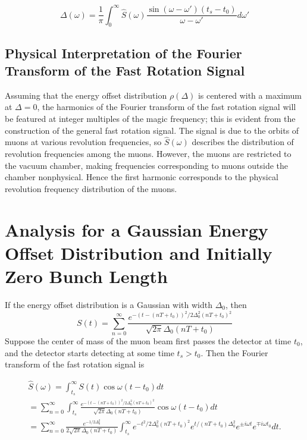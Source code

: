 \begin{equation}
\Delta(\omega)=\frac{1}{\pi}\int^{\infty}_0\hat{S}(\omega)\frac{\sin(\omega-\omega')(t_s-t_0)}{\omega-\omega'}d\omega'
\label{eq:approxDelta}
\end{equation}

\subsection{Physical Interpretation of the Fourier Transform of the Fast Rotation Signal}

Assuming that the energy offset distribution $\rho(\Delta)$ is centered with a maximum at $\Delta=0$, the harmonics of the Fourier transform of the fast rotation signal will be featured at integer multiples of the magic frequency; this is evident from the construction of the general fast rotation signal. The signal is due to the orbits of muons at various revolution frequencies, so $\hat{S}(\omega)$ describes the distribution of revolution frequencies among the muons. However, the muons are restricted to the vacuum chamber, making frequencies corresponding to muons outside the chamber nonphysical. Hence the first harmonic corresponds to the physical revolution frequency distribution of the muons.

\section{Analysis for a Gaussian Energy Offset Distribution and Initially Zero Bunch Length}

If the energy offset distribution is a Gaussian with width $\Delta_0$, then \[S(t)=\sum^{\infty}_{n=0}\frac{e^{-(t-(nT+t_0))^2/2\Delta^2_0(nT+t_0)^2}}{\sqrt{2\pi}\Delta_0(nT+t_0)}\] Suppose the center of mass of the muon beam first passes the detector at time $t_0$, and the detector starts detecting at some time $t_s>t_0$. Then the Fourier transform of the fast rotation signal is

\begin{gather}
\hat{S}(\omega)=\int^{\infty}_{t_s}S(t)\cos\omega(t-t_0) dt \nonumber \\
=\sum^{\infty}_{n=0}\int^{\infty}_{t_s}\frac{e^{-(t-(nT+t_0))^2/2\Delta^2_0(nT+t_0)^2}}{\sqrt{2\pi}\Delta_0(nT+t_0)}\cos\omega(t-t_0)dt \nonumber \\ 
=\sum^{\infty}_{n=0}\frac{e^{-1/2\Delta^2_0}}{2\sqrt{2\pi}\Delta_0(nT+t_0)}\int^{\infty}_{t_s}e^{-t^2/2\Delta^2_0(nT+t_0)^2}e^{t/(nT+t_0)\Delta^2_0}e^{\pm i\omega t}e^{\mp i\omega t_0}dt.
\end{gather}



